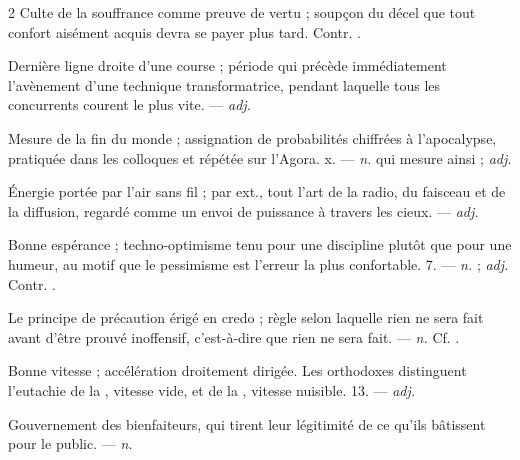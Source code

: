 \begin{multicols}{2}
  Culte de la souffrance comme preuve de vertu ; soupçon du décel que tout confort aisément acquis devra se payer plus tard. Contr. .

 Dernière ligne droite d'une course ; période qui précède immédiatement l'avènement d'une technique transformatrice, pendant laquelle tous les concurrents courent le plus vite. —  \textit{adj.}

 Mesure de la fin du monde ; assignation de probabilités chiffrées à l'apocalypse, pratiquée dans les colloques et répétée sur l'Agora.   x. —  \textit{n.} qui mesure ainsi ;  \textit{adj.}

 Énergie portée par l'air sans fil ; par ext., tout l'art de la radio, du faisceau et de la diffusion, regardé comme un envoi de puissance à travers les cieux. —  \textit{adj.}

 Bonne espérance ; techno-optimisme tenu pour une discipline plutôt que pour une humeur, au motif que le pessimisme est l'erreur la plus confortable.   7. —  \textit{n.} ;  \textit{adj.} Contr. .

 Le principe de précaution érigé en credo ; règle selon laquelle rien ne sera fait avant d'être prouvé inoffensif, c'est-à-dire que rien ne sera fait. —  \textit{n.} Cf. .

 Bonne vitesse ; accélération droitement dirigée. Les orthodoxes distinguent l'eutachie de la , vitesse vide, et de la , vitesse nuisible.   13. —  \textit{adj.}

 Gouvernement des bienfaiteurs, qui tirent leur légitimité de ce qu'ils bâtissent pour le public.  —  \textit{n.}


\end{multicols}
